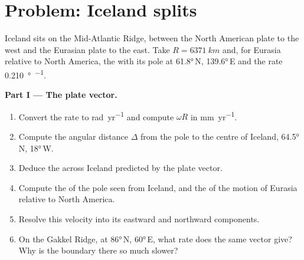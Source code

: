 \section{Problem: Iceland splits}

\begin{problem}
\label{pb:b1:plate-kinematics:1}
Iceland sits on the Mid-Atlantic Ridge, between the North American plate to the
west and the Eurasian plate to the east. Take $R = \qty{6371}{km}$ and, for
Eurasia relative to North America, the  with its pole at
\ang{61.8}\,N, \ang{139.6}\,E and the rate \qty{0.210}{\degree\per\Myr}.

\medskip
\noindent\textbf{Part I --- The plate vector.}
\begin{enumerate}
  \item Convert the rate to \unit{rad.yr^{-1}} and compute $\omega R$ in
        \unit{mm.yr^{-1}}.
  \item Compute the angular distance $\Delta$ from the pole to the centre of
        Iceland, \ang{64.5}\,N, \ang{18}\,W.
  \item Deduce the  across Iceland predicted by the plate
        vector.
  \item Compute the  of the pole seen from Iceland, and the  of the
        motion of Eurasia relative to North America.
  \item Resolve this velocity into its eastward and northward components.
  \item On the Gakkel Ridge, at \ang{86}\,N, \ang{60}\,E, what rate does the same
        vector give? Why is the boundary there so much slower?
\end{enumerate}


\end{problem}
